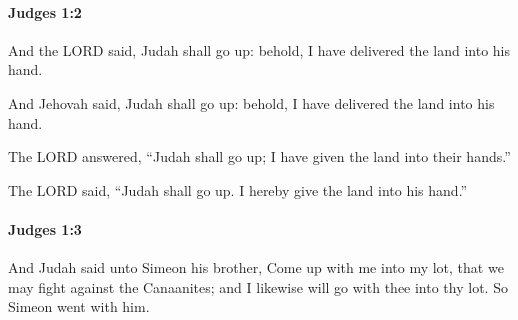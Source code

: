		\paragraph{Judges 1:2} %
			\label{JUDGES-1-2}

			And the LORD said, Judah shall go up: behold, I have delivered the land into his hand.

			\begin{versebox}
					\item[BHS] 
					\item[ASV] And Jehovah said, Judah shall go up: behold, I have delivered the land into his hand.
					\item[NIV] The LORD answered, “Judah shall go up; I have given the land into their hands.”
					\item[NRSV] The LORD said, “Judah shall go up. I hereby give the land into his hand.”
			\end{versebox}

		\paragraph{Judges 1:3} %
			\label{JUDGES-1-3}

			And Judah said unto Simeon his brother, Come up with me into my lot, that we may fight against the Canaanites; and I likewise will go with thee into thy lot. So Simeon went with him.

